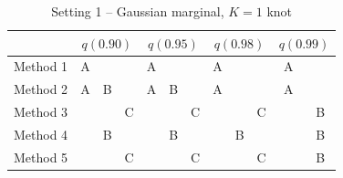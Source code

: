 \documentclass[11pt]{article}
\begin{document}
\begin{table}[htbp]
  \centering
  \caption{Setting 1 -- Gaussian marginal, $K = 1$ knot}
  \label{tbl:gaussim}
  \begin{tabular}{|l|ccc|ccc|ccc|cc|}
    \cline{2-12}
    \multicolumn{1}{c}{} & \multicolumn{3}{|c}{$q(0.90)$} & \multicolumn{3}{|c}{$q(0.95)$} & \multicolumn{3}{|c}{$q(0.98)$} & \multicolumn{2}{|c|}{$q(0.99)$} \\
    \hline
    Method 1 & A &   &   & A &   &   & A &   &   & A &   \\
    \hline
    Method 2 & A & B &   & A & B &   & A &   &   & A &   \\
    \hline
    Method 3 &   &   & C &   &   & C &   &   & C &   & B \\
    \hline
    Method 4 &   & B &   &   & B &   &   & B &   &   & B \\
    \hline
    Method 5 &   &   & C &   &   & C &   &   & C &   & B \\
    \hline
  \end{tabular}
\end{table}

\end{document}
